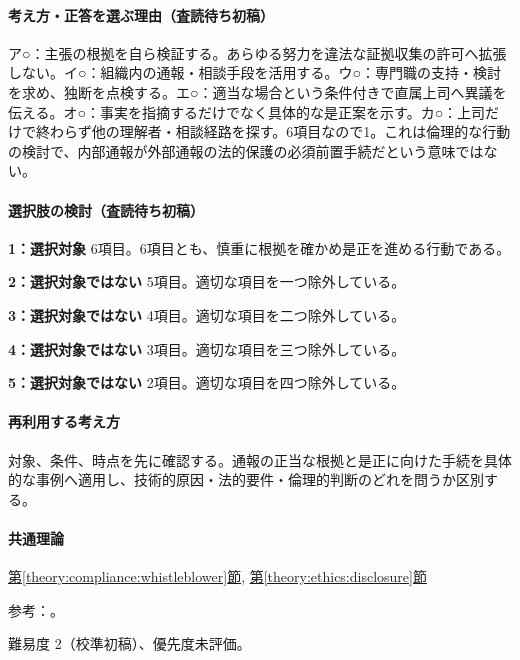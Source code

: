 \paragraph{考え方・正答を選ぶ理由（査読待ち初稿）} ア○：主張の根拠を自ら検証する。あらゆる努力を違法な証拠収集の許可へ拡張しない。イ○：組織内の通報・相談手段を活用する。ウ○：専門職の支持・検討を求め、独断を点検する。エ○：適当な場合という条件付きで直属上司へ異議を伝える。オ○：事実を指摘するだけでなく具体的な是正案を示す。カ○：上司だけで終わらず他の理解者・相談経路を探す。6項目なので1。これは倫理的な行動の検討で、内部通報が外部通報の法的保護の必須前置手続だという意味ではない。

\paragraph{選択肢の検討（査読待ち初稿）}\mbox{}\par

\noindent\textbf{1：選択対象} 6項目。6項目とも、慎重に根拠を確かめ是正を進める行動である。\par

\noindent\textbf{2：選択対象ではない} 5項目。適切な項目を一つ除外している。\par

\noindent\textbf{3：選択対象ではない} 4項目。適切な項目を二つ除外している。\par

\noindent\textbf{4：選択対象ではない} 3項目。適切な項目を三つ除外している。\par

\noindent\textbf{5：選択対象ではない} 2項目。適切な項目を四つ除外している。\par

\paragraph{再利用する考え方} 対象、条件、時点を先に確認する。通報の正当な根拠と是正に向けた手続を具体的な事例へ適用し、技術的原因・法的要件・倫理的判断のどれを問うか区別する。

\paragraph{共通理論} \hyperref[theory:compliance:whistleblower]{第\ref*{theory:compliance:whistleblower}節}, \hyperref[theory:ethics:disclosure]{第\ref*{theory:ethics:disclosure}節}

\par 参考：\cite{ipej_ethics2011,caa_handbook_pre2022,caa_current_faq}。

\par 難易度 2（校準初稿）、優先度未評価。
